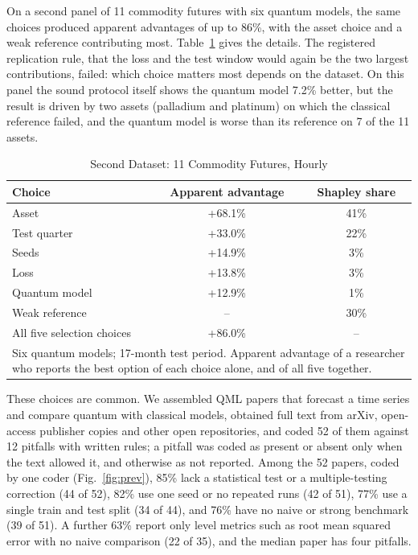 \documentclass{ieeeaccess}
\begin{document}
 On a second panel of 11 commodity futures with six quantum models, the same choices produced apparent advantages of up to 86\%, with the asset choice and a weak reference contributing most. Table~\ref{tab:panel} gives the details. The registered replication rule, that the loss and the test window would again be the two largest contributions, failed: which choice matters most depends on the dataset. On this panel the sound protocol itself shows the quantum model 7.2\% better, but the result is driven by two assets (palladium and platinum) on which the classical reference failed, and the quantum model is worse than its reference on 7 of the 11 assets.

\begin{table}[t]
\caption{Second Dataset: 11 Commodity Futures, Hourly}
\label{tab:panel}
\centering
\begin{tabular}{lcc}
\hline
Choice & Apparent advantage & Shapley share \\
\hline
Asset & +68.1\% & 41\% \\
Test quarter & +33.0\% & 22\% \\
Seeds & +14.9\% & 3\% \\
Loss & +13.8\% & 3\% \\
Quantum model & +12.9\% & 1\% \\
Weak reference & -- & 30\% \\
All five selection choices & +86.0\% & -- \\
\hline
\multicolumn{3}{p{7.6cm}}{\footnotesize Six quantum models; 17-month test period. Apparent advantage of a researcher who reports the best option of each choice alone, and of all five together.}\\
\end{tabular}
\end{table}

These choices are common. We assembled QML papers that forecast a time series and compare quantum with classical models, obtained full text from arXiv, open-access publisher copies and other open repositories, and coded 52 of them against 12 pitfalls with written rules; a pitfall was coded as present or absent only when the text allowed it, and otherwise as not reported. Among the 52 papers, coded by one coder (Fig.~\ref{fig:prev}), 85\% lack a statistical test or a multiple-testing correction (44 of 52), 82\% use one seed or no repeated runs (42 of 51), 77\% use a single train and test split (34 of 44), and 76\% have no naive or strong benchmark (39 of 51). A further 63\% report only level metrics such as root mean squared error with no naive comparison (22 of 35), and the median paper has four pitfalls.
\end{document}
